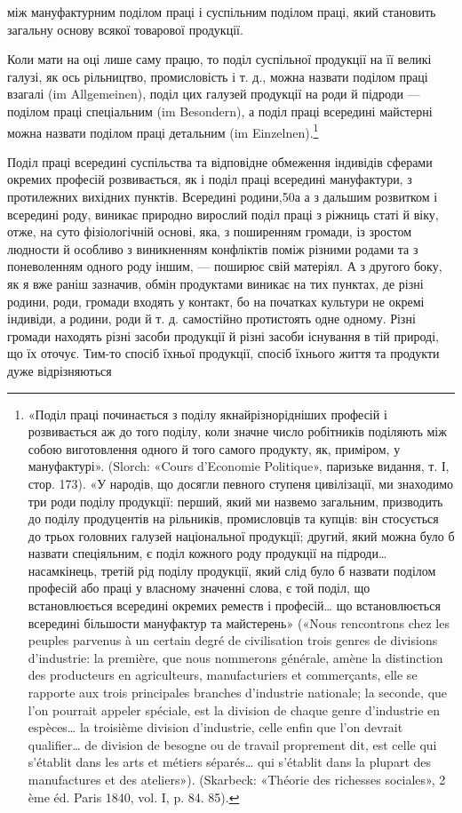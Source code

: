 \parcont{}  %
між мануфактурним поділом праці і суспільним поділом праці,
який становить загальну основу всякої товарової продукції.

Коли мати на оці лише саму працю, то поділ суспільної продукції
на її великі галузі, як ось рільництво, промисловість
і т. д., можна назвати поділом праці взагалі (im Allgemeinen),
поділ цих галузей продукції на роди й підроди — поділом праці
спеціальним (im Besondern), а поділ праці всередині майстерні
можна назвати поділом праці детальним (im Einzelnen).\footnote{
«Поділ праці починається з поділу якнайрізнорідніших професій
і розвивається аж до того поділу, коли значне число робітників поділяють
між собою виготовлення одного й того самого продукту, як, приміром,
у мануфактурі». (Slorch: «Cours d’Economie Politique», паризьке
видання, т. І, стор. 173). «У народів, що досягли певного ступеня цивілізації,
ми знаходимо три роди поділу продукції: перший, який ми назвемо
загальним, призводить до поділу продуцентів на рільників, промисловців
та купців: він стосується до трьох головних галузей національної
продукції; другий, який можна було б назвати спеціяльним, є поділ
кожного роду продукції на підроди\dots{} насамкінець, третій рід поділу
продукції, який слід було б назвати поділом професій або праці у власному
значенні слова, є той поділ, що встановлюється всередині окремих реместв
і професій\dots{} що встановлюється всередині більшости мануфактур
та майстерень» («Nous rencontrons chez les peuples parvenus à un certain
degré de civilisation trois genres de divisions d’industrie: la première,
que nous nommerons générale, amène la distinction des producteurs en
agriculteurs, manufacturiers et commerçants, elle se rapporte aux trois principales
branches d’industrie nationale; la seconde, que l’on pourrait appeler
spéciale, est la division de chaque genre d’industrie en espèces\dots{} la troisième
division d’industrie, celle enfin que l’on devrait qualifier\dots{} de division
de besogne ou de travail proprement dit, est celle qui s’établit dans les arts
et métiers séparés\dots{} qui s’établit dans la plupart des manufactures et des
ateliers»). (Skarbeck: «Théorie des richesses sociales», 2 ème éd. Paris
1840, vol. I, p. 84. 85).
}

Поділ праці всередині суспільства та відповідне обмеження
індивідів сферами окремих професій розвивається, як і поділ
праці всередині мануфактури, з протилежних вихідних пунктів.
Всередині родини,50а а з дальшим розвитком і всередині роду,
виникає природно вирослий поділ праці з ріжниць статі й віку,
отже, на суто фізіологічній основі, яка, з поширенням громади,
із зростом людности й особливо з виникненням конфліктів поміж
різними родами та з поневоленням одного роду іншим, — поширює
свій матеріял. А з другого боку, як я вже раніш зазначив,
обмін продуктами виникає на тих пунктах, де різні родини,
роди, громади входять у контакт, бо на початках культури не
окремі індивіди, а родини, роди й т. д. самостійно протистоять одне
одному. Різні громади находять різні засоби продукції й різні
засоби існування в тій природі, що їх оточує. Тим-то спосіб їхньої
продукції, спосіб їхнього життя та продукти дуже відрізняються


